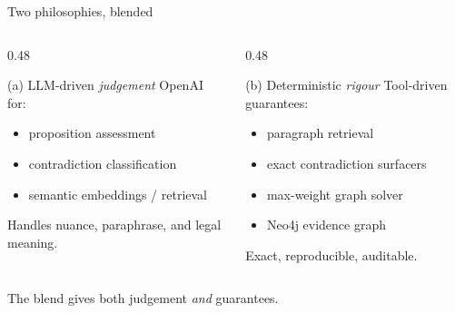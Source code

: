 \documentclass[aspectratio=169,10pt]{beamer}
\begin{document}
\begin{frame}{Two philosophies, blended}
  \begin{columns}[T]
    \begin{column}{0.48\textwidth}
      \begin{block}{(a) LLM-driven \emph{judgement}}
        OpenAI for:
        \begin{itemize}
          \item proposition assessment
          \item contradiction classification
          \item semantic embeddings / retrieval
        \end{itemize}
        Handles nuance, paraphrase, and legal meaning.
      \end{block}
    \end{column}
    \begin{column}{0.48\textwidth}
      \begin{block}{(b) Deterministic \emph{rigour}}
        Tool-driven guarantees:
        \begin{itemize}
          \item paragraph retrieval
          \item exact contradiction surfacers
          \item max-weight graph solver
          \item Neo4j evidence graph
        \end{itemize}
        Exact, reproducible, auditable.
      \end{block}
    \end{column}
  \end{columns}
  \medskip
  \begin{center}
    \alert{The blend gives both judgement \emph{and} guarantees.}
  \end{center}
\end{frame}
\end{document}
